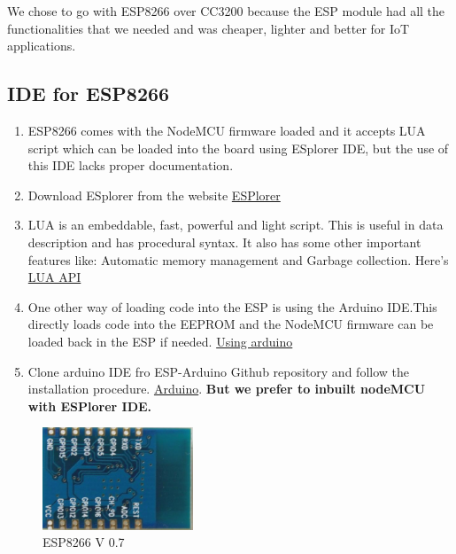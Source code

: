 \documentclass[16pt]{article}
\begin{document}
\vspace{0.4cm}

We chose to go with ESP8266 over CC3200 because the ESP module had all
the functionalities that we needed and was cheaper, lighter and better
for IoT applications.




\subsection{IDE for ESP8266}

\begin{enumerate}

\item
  ESP8266 comes with the NodeMCU firmware loaded and it accepts LUA
  script which can be loaded into the board using ESplorer IDE, but the
  use of this IDE lacks proper documentation.
\item
  Download ESplorer from the website {\color{red}\href{http://esp8266.ru/esplorer/#download}{ESPlorer}}
\item
  LUA is an embeddable, fast, powerful and light script. This is useful in data
  description and has procedural syntax. It also has some other
  important features like: Automatic memory management and Garbage
  collection. Here's {\color{red}\href{http://www.lua.org/manual/5.3/}{LUA API}}
\item
  One other way of loading code into the ESP is using the Arduino
  IDE.This directly loads code into the EEPROM and the NodeMCU firmware
  can be loaded back in the ESP if
  needed. {\color{red}\href{https://learn.adafruit.com/adafruit-huzzah-esp8266-breakout/using-arduino-ide}{Using arduino}}
\item Clone
  arduino IDE fro ESP-Arduino Github repository and follow
  the installation procedure. {\color{red}\href{https://github.com/esp8266/Arduino.git}{Arduino}}. \textbf{But we prefer to inbuilt nodeMCU with ESPlorer IDE.}
\end{enumerate}


 \begin{figure}
\hspace{3cm}
\includegraphics[width=0.4\textwidth]{images/ESP1.jpg}
\caption{ESP8266 V 0.7}
\end{figure}
\end{document}

